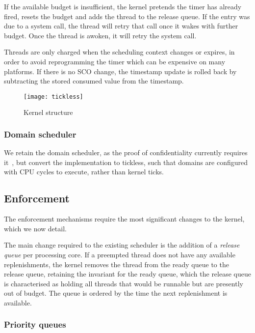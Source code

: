 If the available budget is insufficient, the kernel pretends the timer has already fired,
resets the budget and adds the thread to the release queue. If the entry was due to a system call,
the thread will retry that call once it wakes with further budget.
Once the thread is awoken, it will retry the system call.

Threads are only charged when the scheduling context changes or expires, in order to avoid
reprogramming the timer which can be expensive on many platforms. 
If there is no \gls{SCO} change, the timestamp update is rolled back by subtracting the
stored consumed value from the timestamp.

\begin{figure}
    \centering 
    \texttt{[image: tickless]}
    \caption{Kernel structure}
    \label{figure:tickless}
\end{figure}

\subsubsection{Domain scheduler}

We retain the domain scheduler, as the proof of confidentiality currently requires
it~\citep{Murray_MBGBSLGK_13}, but convert the implementation to tickless, such that domains are
configured with CPU cycles to execute, rather than kernel ticks.

\subsection{Enforcement}

The enforcement mechanisms require the most significant changes to the kernel, which we now detail.

The main change required to the existing scheduler is the addition of a \emph{release queue} per
processing core. If a
preempted thread does not have any available replenishments, the kernel removes the thread from the
ready queue to the release queue, retaining the invariant for the ready queue, which the release
queue is characterised as holding all threads that would be runnable but are presently out of
budget. The queue is ordered by the time the next replenishment is available.

\subsubsection{Priority queues}


